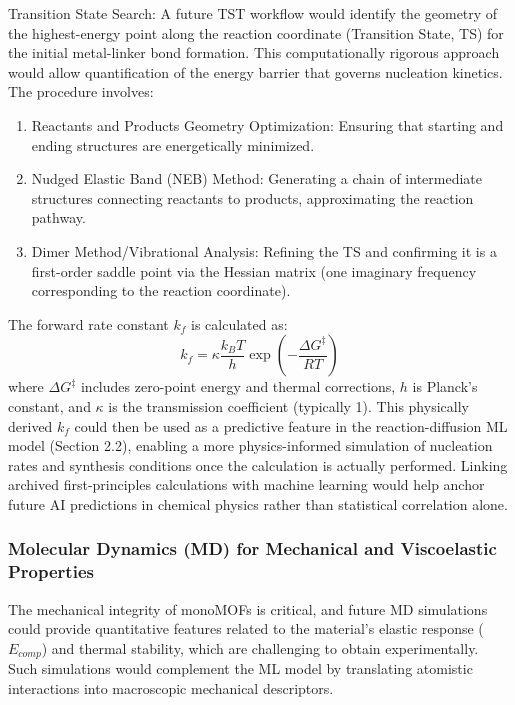 \documentclass[12pt,a4paper]{article}
\begin{document}
Transition State Search:  
A future TST workflow would identify the geometry of the highest-energy point along the reaction coordinate (Transition State, TS) for the initial metal-linker bond formation. This computationally rigorous approach would allow quantification of the energy barrier that governs nucleation kinetics. The procedure involves:
\begin{enumerate}
    \item Reactants and Products Geometry Optimization: Ensuring that starting and ending structures are energetically minimized.
    \item Nudged Elastic Band (NEB) Method: Generating a chain of intermediate structures connecting reactants to products, approximating the reaction pathway.
    \item Dimer Method/Vibrational Analysis: Refining the TS and confirming it is a first-order saddle point via the Hessian matrix (one imaginary frequency corresponding to the reaction coordinate).
\end{enumerate}

The forward rate constant $k_f$ is calculated as:
\[
k_f = \kappa \frac{k_B T}{h} \exp\left(-\frac{\Delta G^\ddagger}{R T}\right)
\]
where $\Delta G^\ddagger$ includes zero-point energy and thermal corrections, $h$ is Planck’s constant, and $\kappa$ is the transmission coefficient (typically 1). This physically derived $k_f$ could then be used as a predictive feature in the reaction-diffusion ML model (Section 2.2), enabling a more physics-informed simulation of nucleation rates and synthesis conditions once the calculation is actually performed. Linking archived first-principles calculations with machine learning would help anchor future AI predictions in chemical physics rather than statistical correlation alone.


\subsubsection{Molecular Dynamics (MD) for Mechanical and Viscoelastic Properties}

The mechanical integrity of monoMOFs is critical, and future MD simulations could provide quantitative features related to the material's elastic response ($E_{comp}$) and thermal stability, which are challenging to obtain experimentally. Such simulations would complement the ML model by translating atomistic interactions into macroscopic mechanical descriptors.
\end{document}
